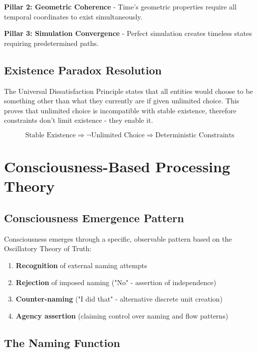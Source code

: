 \documentclass[12pt,a4paper]{article}
\begin{document}
\textbf{Pillar 2: Geometric Coherence} - Time's geometric properties require all temporal coordinates to exist simultaneously.

\textbf{Pillar 3: Simulation Convergence} - Perfect simulation creates timeless states requiring predetermined paths.

\subsection{Existence Paradox Resolution}

The Universal Dissatisfaction Principle states that all entities would choose to be something other than what they currently are if given unlimited choice. This proves that unlimited choice is incompatible with stable existence, therefore constraints don't limit existence - they enable it.

\begin{equation}
\text{Stable Existence} \Rightarrow \neg\text{Unlimited Choice} \Rightarrow \text{Deterministic Constraints}
\end{equation}

\section{Consciousness-Based Processing Theory}

\subsection{Consciousness Emergence Pattern}

Consciousness emerges through a specific, observable pattern based on the Oscillatory Theory of Truth:

\begin{enumerate}
\item \textbf{Recognition} of external naming attempts
\item \textbf{Rejection} of imposed naming ("No" - assertion of independence)
\item \textbf{Counter-naming} ("I did that" - alternative discrete unit creation)
\item \textbf{Agency assertion} (claiming control over naming and flow patterns)
\end{enumerate}

\subsection{The Naming Function}
\end{document}
